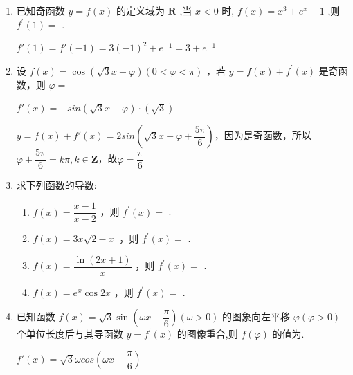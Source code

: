 \begin{enumerate}
    \item 已知奇函数 $y = f\left( x\right)$ 的定义域为 $\mathbf{R}$ ,当 $x < 0$ 时, $f\left( x\right)  = {x}^{3} + {{e}}^{x} - 1$ ,则 ${f}^{\prime }\left( 1\right)  =$ .
    \begin{jieda}
        $f'(1) = f'(-1) = 3(-1)^2+e^{-1} = 3+e^{-1}$
    \end{jieda}
    
    \item 设 $f\left( x\right)  = \cos \left( {\sqrt{3}x + \varphi }\right) \left( {0 < \varphi  < \pi }\right)$ ，若 $y = f\left( x\right)  + {f}^{\prime }\left( x\right)$ 是奇函数，则 $\varphi  =$
    \begin{jieda}
        $f'(x) = -sin(\sqrt{3}x+\varphi) \cdot (\sqrt{3})$

        $y = f(x) + f'(x) = 2sin\left(\sqrt{3}x+\varphi+\dfrac{5\pi}{6}\right)$，因为是奇函数，所以$\varphi+\dfrac{5\pi}{6} = k\pi, k \in \mathbf{Z}$，故$\varphi = \dfrac{\pi}{6}$
    \end{jieda}
    
    \item 求下列函数的导数:
    \begin{enumerate}
        \item $f\left( x\right)  = \dfrac{x - 1}{x - 2}$ ，则 ${f}^{\prime }\left( x\right)  =$ .
        \item $f\left( x\right)  = 3{x}\sqrt{2 - x}$ ，则 ${f}^{\prime }\left( x\right)  =$ .
        \item $f\left( x\right)  = \dfrac{\ln \left( {{2x} + 1}\right) }{x}$ ，则 ${f}^{\prime }\left( x\right)  =$ .
        \item $f\left( x\right)  = {e}^{x}\cos {2x}$ ，则 ${f}^{\prime }\left( x\right)  =$ .
    \end{enumerate}
    
    \item 已知函数 $f\left( x\right)  = \sqrt{3}\sin \left( {{\omega x} - \dfrac{\pi }{6}}\right) \left( {\omega  > 0}\right)$ 的图象向左平移 $\varphi \left( {\varphi  > 0}\right)$ 个单位长度后与其导函数 $y = {f}^{\prime }\left( x\right)$ 的图像重合,则 $f\left( \varphi \right)$ 的值为.
    \begin{jieda}
        $f'(x) = \sqrt{3}\omega cos\left( {{\omega x} - \dfrac{\pi }{6}}\right)$


\end{jieda}
\end{enumerate}
